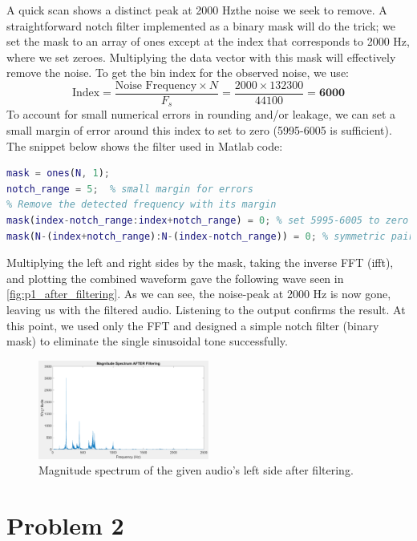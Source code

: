 \documentclass{article}
\begin{document}
A quick scan shows a distinct peak at 2000 Hz\textemdash the noise we seek to remove. A straightforward notch filter implemented as a binary mask will do the trick; we set the mask to an array of ones except at the index that corresponds to 2000 Hz, where we set zeroes. Multiplying the data vector with this mask will effectively remove the noise. To get the bin index for the observed noise, we use:
\[
\text{Index} = \frac{\text{Noise Frequency} \times N}{F_s} = \frac{2000 \times 132300}{44100} = \textbf{6000}
\]
To account for small numerical errors in rounding and/or leakage, we can set a small margin of error around this index to set to zero (5995-6005 is sufficient). The snippet below shows the filter used in Matlab code:

\begin{lstlisting}[language={MATLAB}, label={code:p1}, caption={Notch Filter}]
% notch filter
mask = ones(N, 1);
notch_range = 5;  % small margin for errors
% Remove the detected frequency with its margin
mask(index-notch_range:index+notch_range) = 0; % set 5995-6005 to zero
mask(N-(index+notch_range):N-(index-notch_range)) = 0; % symmetric pair
\end{lstlisting}

Multiplying the left and right sides by the mask, taking the inverse FFT (ifft), and plotting the combined waveform gave the following wave seen in \autoref{fig:p1_after_filtering}. As we can see, the noise-peak at 2000 Hz is now gone, leaving us with the filtered audio. Listening to the output confirms the result. At this point, we used only the FFT and designed a simple notch filter (binary mask) to eliminate the single sinusoidal tone successfully.


\begin{figure}[ht!]
    \centering
    \includegraphics[width=0.5\textwidth]{P1_after_filtering.png}
    \caption{Magnitude spectrum of the given audio's left side after filtering.}
    \label{fig:p1_after_filtering}
\end{figure}


\newpage
\section{Problem 2}
\end{document}
